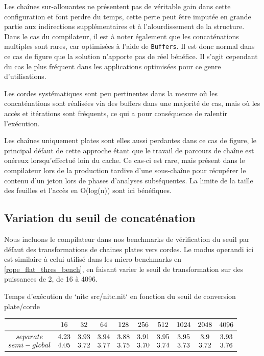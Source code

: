 Les chaînes sur-allouantes ne présentent pas de véritable gain dans cette configuration et font
perdre du temps, cette perte peut être imputée en grande partie aux indirections supplémentaires
et à l'alourdissement de la structure.
Dans le cas du compilateur, il est à noter également que les concaténations multiples sont rares,
car optimisées à l'aide de \texttt{Buffers}.
Il est donc normal dans ce cas de figure que la solution n'apporte pas de réel bénéfice.
Il s'agit cependant du cas le plus fréquent dans les applications optimisées pour ce genre
d'utilisations.

Les cordes systématiques sont peu pertinentes dans la mesure où les concaténations sont
réalisées via des buffers dans une majorité de cas, mais où les accès et itérations sont
fréquents, ce qui a pour conséquence de ralentir l'exécution.

Les chaînes uniquement plates sont elles aussi perdantes dans ce cas de figure, le principal
défaut de cette approche étant que le travail de parcours de chaîne est onéreux lorsqu'effectué
loin du cache.
Ce cas-ci est rare, mais présent dans le compilateur lors de la production tardive d'une sous-chaîne
pour récupérer le contenu d'un jeton lors de phases d'analyses subséquentes.
La limite de la taille des feuilles et l'accès en O(log(n)) sont ici bénéfiques.

\subsection{Variation du seuil de concaténation}

Nous incluons le compilateur dans nos benchmarks de vérification du seuil par défaut des transformations
de chaines plates vers cordes.
Le modus operandi ici est similaire à celui utilisé dans les micro-benchmarks en \ref{rope_flat_thres_bench},
en faisant varier le seuil de transformation sur des puissances de 2, de 16 à 4096.

\begin{table}
	\caption{\label{nitc_time_maxlen}Temps d'exécution de `nitc src/nitc.nit` en fonction du seuil de conversion plate/corde}
	\centering
	$\begin{array}{ *{10}{c} }
		\toprule
		& 16 & 32 & 64 & 128 & 256 & 512 & 1024 & 2048 & 4096 \\
		\midrule
		separate & 4.23 & 3.93 & 3.94 & 3.88 & 3.91 & 3.95 & 3.95 & 3.9 & 3.93\\
		semi-global & 4.05 & 3.72 & 3.77 & 3.75 & 3.70 & 3.74 & 3.73 & 3.72 & 3.76\\
		\bottomrule
	\end{array}$
\end{table}


